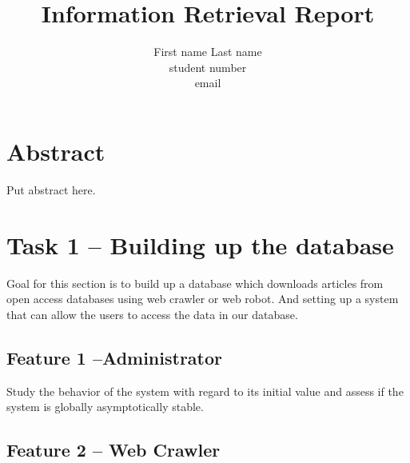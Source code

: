 \documentclass[a4paper]{article} %
\begin{document}

\title{Information Retrieval Report}
\author{First name Last name \\ student number \\ email} 

\maketitle                     %





\section*{Abstract}
\label{abstract}

Put abstract here.


\section*{Task 1 -- Building up the database}
\label{task1}

Goal for this section is to build up a database which downloads articles from open access databases using web crawler or web robot. And setting up a system that can allow the users to access the data in our database.

\subsection*{Feature 1 --Administrator}
\label{task1:feature1}

Study the behavior of the system with regard to its initial value and assess if the system is globally asymptotically stable.

\subsection*{Feature 2 -- Web Crawler}
\label{task1:feature2}
\end{document}
